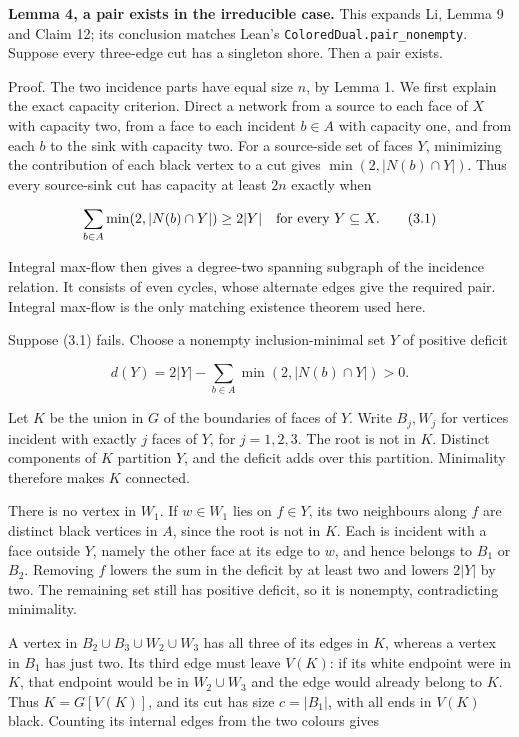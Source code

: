 \documentclass[a4paper,11pt]{amsart}
\begin{document}
\textbf{Lemma 4, a pair exists in the irreducible case.} This expands Li, Lemma 9 and Claim 12; its conclusion matches Lean's \nolinkurl{ColoredDual.pair_nonempty}. Suppose every three-edge cut has a singleton shore. Then a pair exists.

Proof. The two incidence parts have equal size $n$, by Lemma 1. We first explain the exact capacity criterion. Direct a network from a source to each face of $X$ with capacity two, from a face to each incident $b\in A$ with capacity one, and from each $b$ to the sink with capacity two. For a source-side set of faces $Y$, minimizing the contribution of each black vertex to a cut gives $\min(2,\allowbreak |N(b)\cap Y|)$. Thus every source-sink cut has capacity at least $2n$ exactly when

\begin{equation*}
\sum_{b\in A}\min(2,|N(b)\cap Y|)\ge 2|Y|\quad\hbox{for every }Y\subseteq X.    \tag{3.1}
\end{equation*}

Integral max-flow then gives a degree-two spanning subgraph of the incidence relation. It consists of even cycles, whose alternate edges give the required pair. Integral max-flow is the only matching existence theorem used here.

Suppose (3.1) fails. Choose a nonempty inclusion-minimal set $Y$ of positive deficit

\begin{equation*}
d(Y)=2|Y|-\sum_{b\in A}\min(2,|N(b)\cap Y|)>0.
\end{equation*}

Let $K$ be the union in $G$ of the boundaries of faces of $Y$. Write $B_j,\allowbreak W_j$ for vertices incident with exactly $j$ faces of $Y$, for $j=1,\allowbreak 2,\allowbreak 3$. The root is not in $K$. Distinct components of $K$ partition $Y$, and the deficit adds over this partition. Minimality therefore makes $K$ connected.

There is no vertex in $W_1$. If $w\in W_1$ lies on $f\in Y$, its two neighbours along $f$ are distinct black vertices in $A$, since the root is not in $K$. Each is incident with a face outside $Y$, namely the other face at its edge to $w$, and hence belongs to $B_1$ or $B_2$. Removing $f$ lowers the sum in the deficit by at least two and lowers $2|Y|$ by two. The remaining set still has positive deficit, so it is nonempty, contradicting minimality.

A vertex in $B_2\cup B_3\cup W_2\cup W_3$ has all three of its edges in $K$, whereas a vertex in $B_1$ has just two. Its third edge must leave $V(K)$: if its white endpoint were in $K$, that endpoint would be in $W_2\cup W_3$ and the edge would already belong to $K$. Thus $K=G[V(K)]$, and its cut has size $c=|B_1|$, with all ends in $V(K)$ black. Counting its internal edges from the two colours gives
\end{document}
